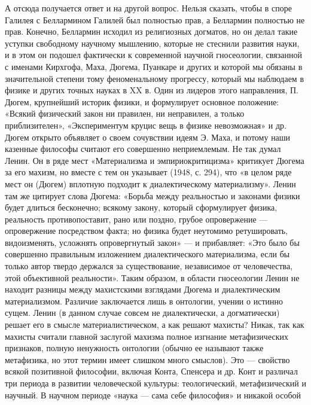 А отсюда получается ответ и на  другой вопрос. Нельзя сказать, чтобы в
споре Галилея  с Беллармином Галилей  был полностью прав,  а Беллармин
полностью не прав. Конечно, Беллармин исходил из религиозных догматов,
но он  делал такие  уступки свободному  научному мышлению,  которые не
стеснили развития науки, и в  этом он подошел фактически к современной
научной  гносеологии,  связанной  с именами  Кирхгофа,  Маха,  Дюгема,
Пуанкаре и  других и  которой мы обязаны  в значительной  степени тому
феноменальному  прогрессу,  который мы  наблюдаем  в  физике и  других
точных науках  в XX в.  Один из  лидеров этого направления,  П. Дюгем,
крупнейший историк  физики, и формулирует основное  положение: «Всякий
физический закон ни правилен,  ни неправилен, а только приблизителен»,
«Экспериментум круцис вещь  в физике невозможная» и  др. Дюгем открыто
объявляет о  своем сочувствии  идеям Э. Маха,  и потому  наши казенные
философы считают его совершенно неприемлемым. Не так думал Ленин. Он в
ряде мест  «Материализма и эмпириокритицизма» критикует  Дюгема за его
махизм,  но  вместе  с  тем  он  указывает  (1948,  с.  294),  что  «в
целом  ряде  мест  он  (Дюгем)  вплотную  подходит  к  диалектическому
материализму».  Ленин  там же  цитирует  слова  Дюгема: «Борьба  между
реальностью  и  законами  физики  будет  длиться  бесконечно;  всякому
закону,  который  сформулирует   физика,  реальность  противопоставит,
рано  или поздно,  грубое  опровержение  --- опровержение  посредством
факта;   но  физика   будет   неутомимо  ретушировать,   видоизменять,
усложнять  опровергнутый  закон»  ---   и  прибавляет:  «Это  было  бы
совершенно  правильным изложением  диалектического материализма,  если
бы  только  автор твердо  держался  за  существование, независимое  от
человечества, этой  объективной реальности». Таким образом,  в области
гносеологии  Ленин  не  находит разницы  между  махистскими  взглядами
Дюгема  и диалектическим  материализмом. Различие  заключается лишь  в
онтологии, учении  о истинно сущем.  Ленин (в данном случае  совсем не
диалектически, а догматически) решает его в смысле материалистическом,
а как решают махисты? Никак,  так как махисты считали главной заслугой
махизма  полное изгнание  метафизических признаков,  полную ненужность
онтологии (обычно ее  называют также метафизика, но  этот термин имеет
слишком много смыслов). Это  --- свойство всякой позитивной философии,
включая Конта, Спенсера  и др. Конт и различал три  периода в развитии
человеческой  культуры:  теологический,  метафизический и  научный.  В
научном  периоде «наука  ---  сама себе  философия»  и никакой  особой

